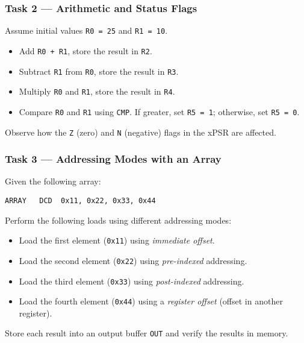 \subsubsection{Task 2 --- Arithmetic and Status Flags}
Assume initial values \texttt{R0 = 25} and \texttt{R1 = 10}.
\begin{itemize}[nosep]
    \item Add \texttt{R0 + R1}, store the result in \texttt{R2}.
    \item Subtract \texttt{R1} from \texttt{R0}, store the result in \texttt{R3}.
    \item Multiply \texttt{R0} and \texttt{R1}, store the result in \texttt{R4}.
    \item Compare \texttt{R0} and \texttt{R1} using \texttt{CMP}.
          If greater, set \texttt{R5 = 1}; otherwise, set \texttt{R5 = 0}.
\end{itemize}
Observe how the \texttt{Z} (zero) and \texttt{N} (negative) flags in the xPSR are affected.

\subsubsection{Task 3 --- Addressing Modes with an Array}
Given the following array:
\begin{lstlisting}
ARRAY   DCD  0x11, 0x22, 0x33, 0x44
\end{lstlisting}

Perform the following loads using different addressing modes:
\begin{itemize}[nosep]
    \item Load the first element (\texttt{0x11}) using \emph{immediate offset}.
    \item Load the second element (\texttt{0x22}) using \emph{pre-indexed} addressing.
    \item Load the third element (\texttt{0x33}) using \emph{post-indexed} addressing.
    \item Load the fourth element (\texttt{0x44}) using a \emph{register offset} (offset in another register).
\end{itemize}

Store each result into an output buffer \texttt{OUT} and verify the results in memory.


